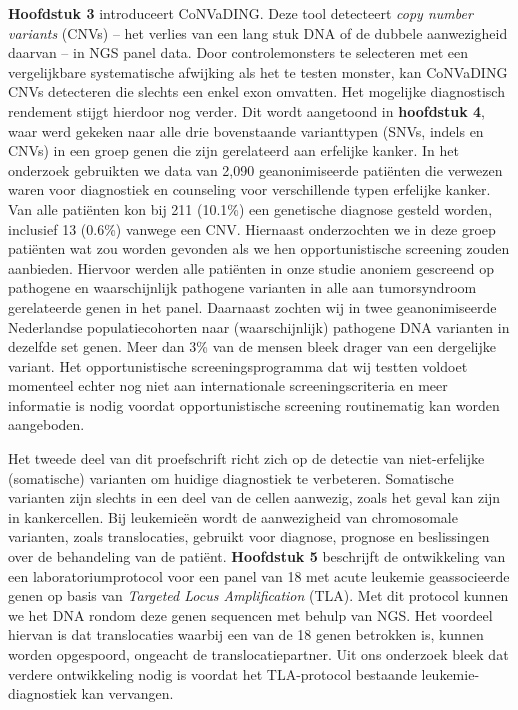\begin{appendices}
	\textbf{Hoofdstuk 3} introduceert CoNVaDING. Deze tool detecteert \textsl{copy number variants} (CNVs) – het verlies van een lang stuk DNA of de dubbele aanwezigheid daarvan – in NGS panel data. Door controlemonsters te selecteren met een vergelijkbare systematische afwijking als het te testen monster, kan CoNVaDING CNVs detecteren die slechts een enkel exon omvatten. Het mogelijke diagnostisch rendement stijgt hierdoor nog verder. Dit wordt aangetoond in \textbf{hoofdstuk 4}, waar werd gekeken naar alle drie bovenstaande varianttypen (SNVs, indels en CNVs) in een groep genen die zijn gerelateerd aan erfelijke kanker. In het onderzoek gebruikten we data van 2,090 geanonimiseerde patiënten die verwezen waren voor diagnostiek en counseling voor verschillende typen erfelijke kanker. Van alle patiënten kon bij 211 (10.1\%) een genetische diagnose gesteld worden, inclusief 13 (0.6\%) vanwege een CNV. Hiernaast onderzochten we in deze groep patiënten wat zou worden gevonden als we hen opportunistische screening zouden aanbieden. Hiervoor werden alle patiënten in onze studie anoniem gescreend op pathogene en waarschijnlijk pathogene varianten in alle aan tumorsyndroom gerelateerde genen in het panel. Daarnaast zochten wij in twee geanonimiseerde Nederlandse populatiecohorten naar (waarschijnlijk) pathogene DNA varianten in dezelfde set genen. Meer dan 3\% van de mensen bleek drager van een dergelijke variant. Het opportunistische screeningsprogramma dat wij testten voldoet momenteel echter nog niet aan internationale screeningscriteria en meer informatie is nodig voordat opportunistische screening routinematig kan worden aangeboden.
	
	Het tweede deel van dit proefschrift richt zich op de detectie van niet-erfelijke (somatische) varianten om huidige diagnostiek te verbeteren. Somatische varianten zijn slechts in een deel van de cellen aanwezig, zoals het geval kan zijn in kankercellen. Bij leukemieën wordt de aanwezigheid van chromosomale varianten, zoals translocaties, gebruikt voor diagnose, prognose en beslissingen over de behandeling van de patiënt. \textbf{Hoofdstuk 5} beschrijft de ontwikkeling van een laboratoriumprotocol voor een panel van 18 met acute leukemie geassocieerde genen op basis van \textsl{Targeted Locus Amplification} (TLA). Met dit protocol kunnen we het DNA rondom deze genen sequencen met behulp van NGS. Het voordeel hiervan is dat translocaties waarbij een van de 18 genen betrokken is, kunnen worden opgespoord, ongeacht de translocatiepartner. Uit ons onderzoek bleek dat verdere ontwikkeling nodig is voordat het TLA-protocol bestaande leukemie-diagnostiek kan vervangen. 
	

\end{appendices}

